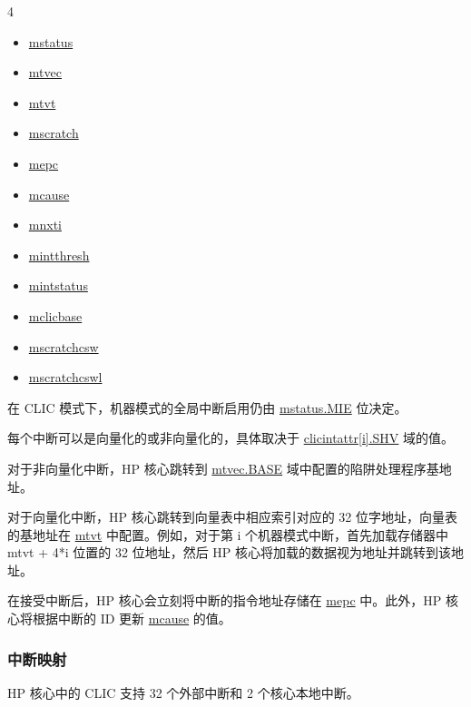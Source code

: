\documentclass[main\_\_CN.tex]{subfiles}
\begin{document}
\begin{multicols}{4}
\begin{itemize}
\item \hyperref[regdesc:MSTATUS]{mstatus}
\item \hyperref[regdesc:MTVEC]{mtvec}
\item \hyperref[regdesc:MTVT]{mtvt}
\item \hyperref[regdesc:MSCRATCH]{mscratch}
\item \hyperref[regdesc:MEPC]{mepc}
\item \hyperref[regdesc:MCAUSE]{mcause}
\item \hyperref[regdesc:MNXTI_REG]{mnxti}
\item \hyperref[regdesc:MINTTHRESH]{mintthresh}
\item \hyperref[regdesc:MINTSTATUS]{mintstatus}
\item \hyperref[regdesc:MCLICBASE_REG]{mclicbase}
\item \hyperref[regdesc:MSCRATCHCSW_REG]{mscratchcsw}
\item \hyperref[regdesc:MSCRATCHCSWL_REG]{mscratchcswl}
\end{itemize}
\end{multicols}


在 CLIC 模式下，机器模式的全局中断启用仍由 \hyperref[fielddesc:MSTATUSMIE]{mstatus.MIE} 位决定。


每个中断可以是向量化的或非向量化的，具体取决于 \hyperref[fielddesc:MCLICINTATTR_i_SHV]{clicintattr[i].SHV} 域的值。

对于非向量化中断，HP 核心跳转到 \hyperref[fielddesc:MTVECBASE]{mtvec.BASE} 域中配置的陷阱处理程序基地址。

对于向量化中断，HP 核心跳转到向量表中相应索引对应的 32 位字地址，向量表的基地址在 \hyperref[regdesc:MTVT]{mtvt} 中配置。例如，对于第 i 个机器模式中断，首先加载存储器中 mtvt + 4*i 位置的 32 位地址，然后 HP 核心将加载的数据视为地址并跳转到该地址。

在接受中断后，HP 核心会立刻将中断的指令地址存储在 \hyperref[regdesc:MEPC]{mepc} 中。此外，HP 核心将根据中断的 ID 更新 \hyperref[regdesc:MCAUSE]{mcause} 的值。


\hypertarget{riscvcpu-clic-intmap}{}
\subsubsection{中断映射}
\label{sec:riscvcpu-clic-intmap}

HP 核心中的 CLIC 支持 32 个外部中断和 2 个核心本地中断。
\end{document}
